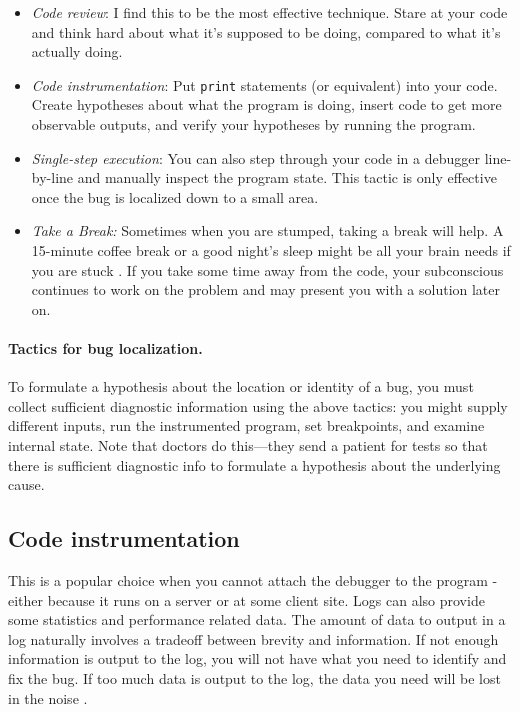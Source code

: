 \begin{itemize}
\item \emph{Code review}: I find this to be the most effective
  technique.  Stare at your code and think hard about what it's
  supposed to be doing, compared to what it's actually doing.
\item \emph{Code instrumentation}: Put {\tt print} statements (or
  equivalent) into your code. Create hypotheses about what the program
  is doing, insert code to get more observable outputs, and verify
  your hypotheses by running the program.
\item \emph{Single-step execution}: You can also step through your
  code in a debugger line-by-line and manually inspect the program
  state. This tactic is only effective once the bug is localized down to a small area.
\item \emph{Take a Break:} Sometimes when you are stumped, taking a break will help. A 15-minute coffee break or a good night's sleep might be all your brain needs if you are stuck \cite{howToProgrammer}. If you take some time away from the code, your subconscious continues to work on the problem and may present you with a solution later on.
\end{itemize}

\paragraph{Tactics for bug localization.}
To formulate a hypothesis about the location or identity of a bug, you
must collect sufficient diagnostic information using the above
tactics: you might supply different inputs, run the
instrumented program, set breakpoints, and examine internal
state. Note that doctors do this---they
send a patient for tests so that there is sufficient diagnostic info
to formulate a hypothesis about the underlying cause.

\subsection*{Code instrumentation} 

This is a popular choice when you cannot attach the debugger to the program - either because it runs on a server or at some client site. Logs can also provide some statistics and performance related data. The amount of data to output in a log naturally involves a tradeoff between brevity and information. If not enough information is output to the log, you will not have what you need to identify and fix the bug. If too much data is output to the log, the data you need will be lost in the noise \cite{howToProgrammer}.

